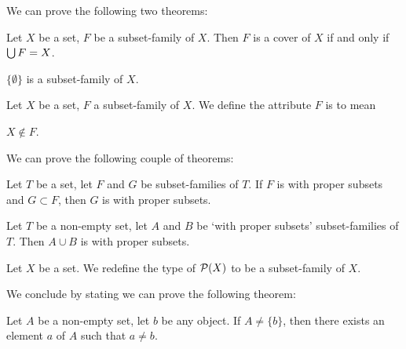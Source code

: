 \documentclass{article}
\begin{document}
We can prove the following two theorems:
\begin{thm}
\item\label{setfam1:45} Let $X$ be a set, $F$ be a subset-family of $X$.
Then $F$ is a cover of $X$ if and only if $\bigcup F=X$.
\item\label{setfam1:46} $\{\emptyset\}$ is a subset-family of $X$.
\end{thm}

\begin{definition}
Let $X$ be a set, $F$ a subset-family of $X$.
We define the attribute $F$ is  to mean
\begin{defn}
\item $X\notin F$.
\end{defn}
\end{definition}

We can prove the following couple of theorems:
\begin{thm}
\item\label{setfam1:47} Let $T$ be a set, let $F$ and $G$ be
  subset-families of $T$. If $F$ is with proper subsets and $G\subset F$,
  then $G$ is with proper subsets.
\item\label{setfam1:48} Let $T$ be a non-empty set, let $A$ and $B$ be
  `with proper subsets' subset-families of $T$. Then $A\cup B$ is with
  proper subsets.
\end{thm}

\begin{definition}
Let $X$ be a set. We redefine the type of $\mathcal{P}(X)$ to be a
subset-family of $X$.
\end{definition}

We conclude by stating we can prove the following theorem:
\begin{thm}
\item\label{setfam1:49} Let $A$ be a non-empty set, let $b$ be any object.
If $A\neq\{b\}$, then there exists an element $a$ of $A$ such that
$a\neq b$.
\end{thm}
\end{document}
